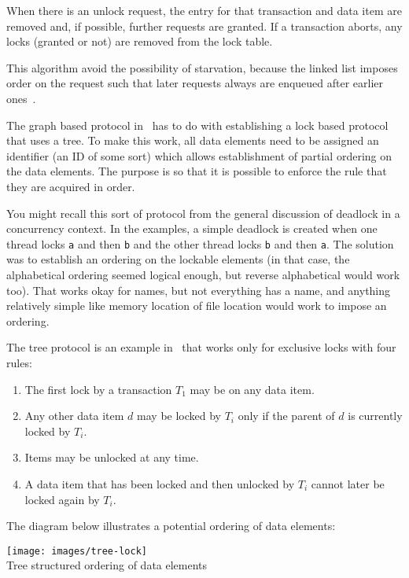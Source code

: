 \documentclass[a4paper]{report}
\begin{document}
When there is an unlock request, the entry for that transaction and data item are removed and, if possible, further requests are granted. If a transaction aborts, any locks (granted or not) are removed from the lock table.

This algorithm avoid the possibility of starvation, because the linked list imposes order on the request such that later requests always are enqueued after earlier ones~\cite{dsc}.

The graph based protocol in~\cite{dsc} has to do with establishing a lock based protocol that uses a tree. To make this work, all data elements need to be assigned an identifier (an ID of some sort) which allows establishment of partial ordering on the data elements. The purpose is so that it is possible to enforce the rule that they are acquired in order.

You might recall this sort of protocol from the general discussion of deadlock in a concurrency context. In the examples, a simple deadlock is created when one thread locks \texttt{a} and then \texttt{b} and the other thread locks \texttt{b} and then \texttt{a}. The solution was to establish an ordering on the lockable elements (in that case, the alphabetical ordering seemed logical enough, but reverse alphabetical would work too). That works okay for names, but not everything has a name, and anything relatively simple like memory location of file location would work to impose an ordering.

The tree protocol is an example in~\cite{dsc} that works only for exclusive locks with four rules:

\begin{enumerate}
	\item The first lock by a transaction $T_{1}$ may be on any data item.
	\item Any other data item $d$ may be locked by $T_{i}$ only if the parent of $d$ is currently locked by $T_{i}$.
	\item Items may be unlocked at any time.
	\item A data item that has been locked and then unlocked by $T_{i}$ cannot later be locked again by $T_{i}$.
\end{enumerate}

The diagram below illustrates a potential ordering of data elements:

\begin{center}
\texttt{[image: images/tree-lock]}\\
Tree structured ordering of data elements~\cite{dsc}
\end{center}
\end{document}
